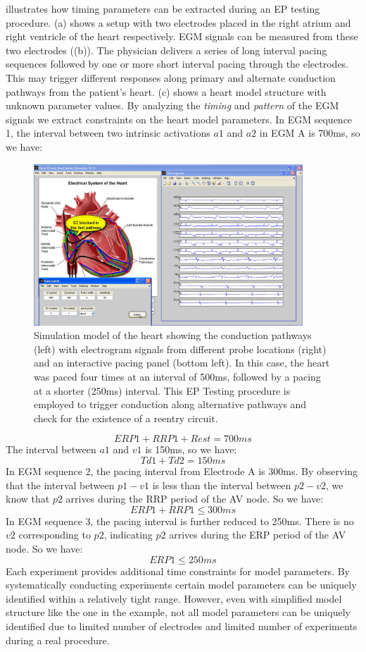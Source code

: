  illustrates how timing parameters can be extracted during an EP testing procedure. (a) shows a setup with two electrodes placed in the right atrium and right ventricle of the heart respectively. EGM signals can be measured from these two electrodes ((b)). The physician delivers a series of long interval pacing sequences followed by one or more short interval pacing through the electrodes. This may trigger different responses along primary and alternate conduction pathways from the patient's heart. (c) shows a heart model structure with unknown parameter values. By analyzing the \emph{timing} and \emph{pattern} of the EGM signals we extract constraints on the heart model parameters. In EGM sequence 1, the interval between two intrinsic activations $a1$ and $a2$ in EGM A is 700ms, so we have:
\begin{figure}[t]
\center
	\includegraphics[width=0.9\textwidth]{figs/vhmsim.png}
	\caption{Simulation model of the heart showing the conduction pathways (left) with electrogram signals from different probe locations (right) and an interactive pacing panel (bottom left). In this case, the heart was paced four times at an interval of 500ms, followed by a pacing at a shorter (250ms) interval. This EP Testing procedure is employed to trigger conduction along alternative pathways and check for the existence of a reentry circuit.}
	\label{fig:vhmsim}
\end{figure}
$$ERP1+RRP1+Rest=700ms$$
The interval between $a1$ and $v1$ is 150ms, so we have:
$$Td1+Td2=150ms$$
In EGM sequence 2, the pacing interval from Electrode A is 300ms. By observing that the interval between $p1-v1$ is less than the interval between $p2-v2$, we know that $p2$ arrives during the RRP period of the AV node. So we have:
$$ERP1+RRP1\leq 300ms$$
In EGM sequence 3, the pacing interval is further reduced to 250ms. There is no $v2$ corresponding to $p2$, indicating $p2$ arrives during the ERP period of the AV node. So we have:
$$ERP1\leq 250ms$$
Each experiment provides additional time constraints for model parameters. By systematically conducting experiments certain model parameters can be uniquely identified within a relatively tight range. However, even with simplified model structure like the one in the example, not all model parameters can be uniquely identified due to limited number of electrodes and limited number of experiments during a real procedure.






